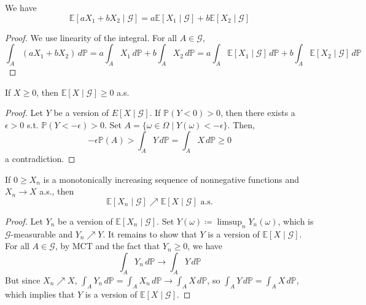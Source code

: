 	\begin{theorem}[Linearity]
	  We have 
		\begin{equation}
			\mathbb{E}[a X_1 + b X_2 \mid \mathscr{G}] = a \mathbb{E}[X_1 \mid \mathscr{G}] + b \mathbb{E}[X_2 \mid \mathscr{G}]
		\end{equation}
	\end{theorem}
	\begin{proof}
	  We use linearity of the integral. For all $A \in \mathscr{G}$, 
		\begin{equation}
			\int_A (a X_1 + b X_2) \,d\mathbb{P} = a \int_A X_1 \,d\mathbb{P} + b \int_A X_2 \,d\mathbb{P} = a \int_A \mathbb{E}[X_1 \mid \mathscr{G}] \,d\mathbb{P} + b \int_A \mathbb{E}[X_2 \mid \mathscr{G}] \,d\mathbb{P}
		\end{equation}
	\end{proof}

	\begin{theorem}[Positivity]
		If $X \geq 0$, then $\mathbb{E}[X \mid \mathscr{G}] \geq 0$ a.s. 
	\end{theorem}
	\begin{proof}
		Let $Y$ be a version of $E[X \mid \mathscr{G}]$. If $\mathbb{P}(Y < 0) > 0$, then there exists a $\epsilon > 0$ s.t. $\mathbb{P}(Y < -\epsilon) > 0$. Set $A = \{\omega \in \Omega \mid Y(\omega) < -\epsilon\}$. Then, 
		\begin{equation}
			-\epsilon \mathbb{P}(A) > \int_A Y\,d\mathbb{P} = \int_A X \,d\mathbb{P} \geq 0
		\end{equation}
		a contradiction. 
	\end{proof}

	\begin{theorem}
	  If $0 \geq X_n$ is a monotonically increasing sequence of nonnegative functions and $X_n \to X$ a.s., then 
		\begin{equation}
			\mathbb{E}[X_n \mid \mathscr{G}] \nearrow \mathbb{E}[X \mid \mathscr{G}] \text{ a.s.}
		\end{equation}
	\end{theorem}
	\begin{proof}
		Let $Y_n$ be a version of $\mathbb{E}[X_n \mid \mathscr{G}]$. Set $Y(\omega) \coloneqq \limsup_n Y_n (\omega)$, which is $\mathscr{G}$-measurable and $Y_n \nearrow Y$. It remains to show that $Y$ is a version of $\mathbb{E}[X \mid \mathscr{G}]$. For all $A \in \mathscr{G}$, by MCT and the fact that $Y_n \geq 0$, we have 
		\begin{equation}
			\int_A Y_n \,d\mathbb{P} \to \int_A Y \,d\mathbb{P}
		\end{equation}
		But since $X_n \nearrow X$, $\int_A Y_n \,d\mathbb{P} = \int_A X_n \,d\mathbb{P} \to \int_A X \,d\mathbb{P}$, so $\int_A Y \, d\mathbb{P} = \int_A X \,d\mathbb{P}$, which implies that $Y$ is a version of $\mathbb{E}[X \mid \mathscr{G}]$. 
	\end{proof}


